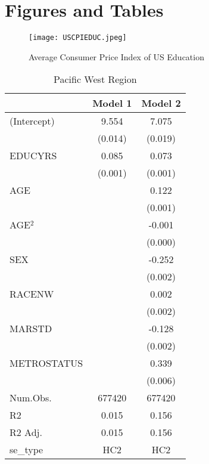 \documentclass[12pt, English]{article}
\begin{document}
\newpage





\newpage

\section*{Figures and Tables}
\begin{figure}[h!]
\centering
\texttt{[image: USCPIEDUC.jpeg]}
\caption{Average Consumer Price Index of US Education}
\label{fig:Figure 1}
\end{figure}



\newpage
\begin{table}
\centering %
    \caption{Pacific West Region}
    \vspace{7.5mm} %
\begin{tabular}[t]{lcc}
\toprule
 & Model 1 & Model 2\\
\midrule
(Intercept) & 9.554 & 7.075\\
 & (0.014) & (0.019)\\
EDUCYRS & 0.085 & 0.073\\
 & (0.001) & (0.001)\\
AGE &  & 0.122\\
 &  & (0.001)\\
AGE$^2$ &  & -0.001\\
 &  & (0.000)\\
SEX &  & -0.252\\
 &  & \vphantom{2} (0.002)\\
RACENW &  & 0.002\\
 &  & \vphantom{1} (0.002)\\
MARSTD &  & -0.128\\
 &  & (0.002)\\
METROSTATUS &  & 0.339\\
 &  & (0.006)\\
\midrule
Num.Obs. & 677420 & 677420\\
R2 & 0.015 & 0.156\\
R2 Adj. & 0.015 & 0.156\\
se\_type & HC2 & HC2\\
\bottomrule
\end{tabular}
\end{table}


\newpage
\end{document}
